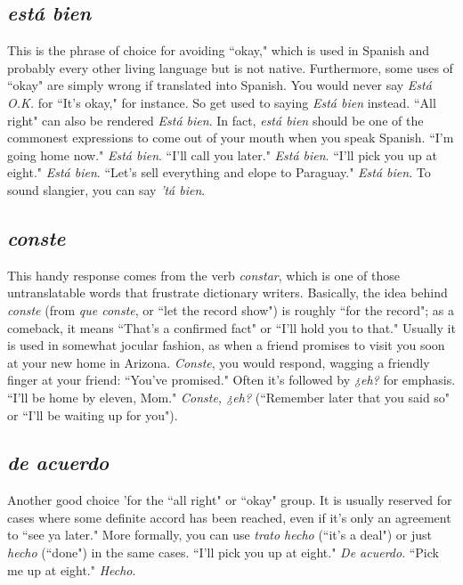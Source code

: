 \subsection{\emph{está bien}}

This is the phrase of choice for avoiding ``okay," which is used
in Spanish and probably every other living language but is not native.
Furthermore, some uses of ``okay" are simply wrong if translated into
Spanish. You would never say \emph{Está O.K.} for ``It's okay," for instance. So
get used to saying \emph{Está bien} instead. ``All right" can also be rendered
\emph{Está bien}. In fact, \emph{está bien} should be one of the commonest expressions to come out of your mouth when you speak Spanish. ``I'm going
home now." \emph{Está bien}. ``I'll call you later." \emph{Está bien}. ``I'll pick you up
at eight." \emph{Está bien}. ``Let's sell everything and elope to Paraguay." \emph{Está
bien}. To sound slangier, you can say \emph{'tá bien}.

\subsection{\emph{conste}}

This handy response comes from the verb \emph{constar}, which is
one of those untranslatable words that frustrate dictionary writers.
Basically, the idea behind \emph{conste} (from \emph{que conste}, or ``let the record
show") is roughly ``for the record"; as a comeback, it means ``That's a
confirmed fact" or ``I'll hold you to that." Usually it is used in somewhat jocular fashion, as when a friend promises to visit you soon at
your new home in Arizona. \emph{Conste}, you would respond, wagging a
friendly finger at your friend: ``You've promised." Often it's followed
by \emph{¿eh?} for emphasis. ``I'll be home by eleven, Mom." \emph{Conste, ¿eh?}
(``Remember later that you said so" or ``I'll be waiting up for you").

\subsection{\emph{de acuerdo}}

Another good choice 'for the ``all right" or ``okay" group. It
is usually reserved for cases where some definite accord has been
reached, even if it's only an agreement to ``see ya later." More formally,
you can use \emph{trato hecho} (``it's a deal") or just \emph{hecho} (``done") in the
same cases. ``I'll pick you up at eight." \emph{De acuerdo}. ``Pick me up at
eight." \emph{Hecho}.

